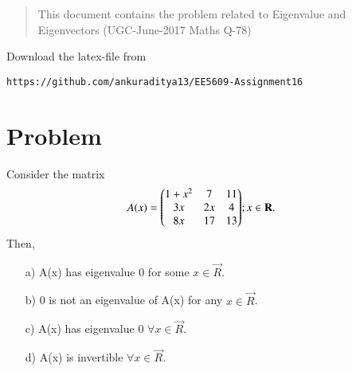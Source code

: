 \documentclass[journal,12pt,twocolumn]{IEEEtran}
\begin{document}
\begin{abstract}
This document contains the problem related to Eigenvalue and Eigenvectors (UGC-June-2017 Maths Q-78) 
\end{abstract}
Download the latex-file from 
\begin{lstlisting}
https://github.com/ankuraditya13/EE5609-Assignment16
\end{lstlisting}

\section{Problem}
Consider the matrix
\begin{align}
A(x) = \begin{pmatrix}1+x^2&7&11\\3x&2x&4\\8x&17&13\end{pmatrix} & ;x\in \mathbf{R}.
\end{align}
Then,
\begin{enumerate}
\item[a)] A(x) has eigenvalue 0 for some $x\in \vec{R}$.
\item[b)] 0 is not an eigenvalue of A(x) for any $x\in \vec{R}$.
\item[c)] A(x) has eigenvalue 0 $\forall x\in \vec{R}$.
\item[d)] A(x) is invertible $\forall x\in \vec{R}$.
\end{enumerate}
\end{document}
